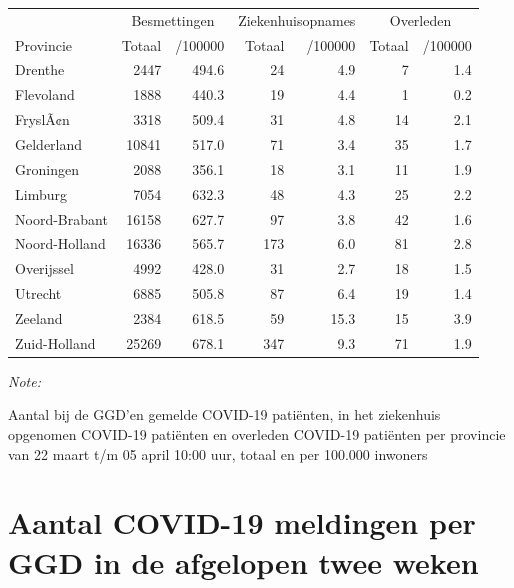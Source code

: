 \documentclass[
  english,
  man,floatsintext]{apa6}
\begin{document}
\begin{table}
\centering
\begin{threeparttable}
\begin{tabular}{lrrrrrr}
\toprule
\multicolumn{1}{c}{ } & \multicolumn{2}{c}{Besmettingen} & \multicolumn{2}{c}{Ziekenhuisopnames} & \multicolumn{2}{c}{Overleden} \\
\cmidrule(l{3pt}r{3pt}){2-3} \cmidrule(l{3pt}r{3pt}){4-5} \cmidrule(l{3pt}r{3pt}){6-7}
Provincie & Totaal & /100000 & Totaal & /100000 & Totaal & /100000\\
\midrule
Drenthe & 2447 & 494.6 & 24 & 4.9 & 7 & 1.4\\
Flevoland & 1888 & 440.3 & 19 & 4.4 & 1 & 0.2\\
FryslÃ¢n & 3318 & 509.4 & 31 & 4.8 & 14 & 2.1\\
Gelderland & 10841 & 517.0 & 71 & 3.4 & 35 & 1.7\\
Groningen & 2088 & 356.1 & 18 & 3.1 & 11 & 1.9\\
Limburg & 7054 & 632.3 & 48 & 4.3 & 25 & 2.2\\
Noord-Brabant & 16158 & 627.7 & 97 & 3.8 & 42 & 1.6\\
Noord-Holland & 16336 & 565.7 & 173 & 6.0 & 81 & 2.8\\
Overijssel & 4992 & 428.0 & 31 & 2.7 & 18 & 1.5\\
Utrecht & 6885 & 505.8 & 87 & 6.4 & 19 & 1.4\\
Zeeland & 2384 & 618.5 & 59 & 15.3 & 15 & 3.9\\
Zuid-Holland & 25269 & 678.1 & 347 & 9.3 & 71 & 1.9\\
\bottomrule
\end{tabular}
\begin{tablenotes}
\item \textit{Note: } 
\item Aantal bij de GGD’en gemelde COVID-19 patiënten, in het ziekenhuis opgenomen COVID-19 patiënten en overleden COVID-19 patiënten per provincie van 22 maart t/m 05 april 10:00 uur, totaal en per 100.000 inwoners
\end{tablenotes}
\end{threeparttable}
\end{table}

\newpage

\hypertarget{aantal-covid-19-meldingen-per-ggd-in-de-afgelopen-twee-weken}{%
\section{Aantal COVID-19 meldingen per GGD in de afgelopen twee weken}\label{aantal-covid-19-meldingen-per-ggd-in-de-afgelopen-twee-weken}}
\end{document}
